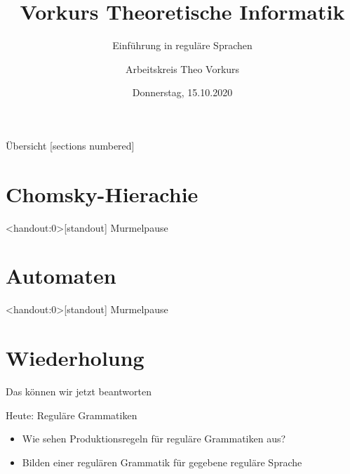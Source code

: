 

\title{Vorkurs Theoretische Informatik}
\subtitle{Einführung in reguläre Sprachen}
\date{Donnerstag, 15.10.2020}
\author{Arbeitskreis  Theo Vorkurs}



\maketitle

\begin{frame}[fragile]{Übersicht}
  [sections numbered]
  \tableofcontents%
\end{frame}


\section{Chomsky-Hierachie}



\begin{frame}<handout:0>[standout]
  Murmelpause
\end{frame}

\section{Automaten}



\begin{frame}<handout:0>[standout]
  Murmelpause
\end{frame}





\section{Wiederholung}


\begin{frame}[fragile]{Das können wir jetzt beantworten}
  \begin{alertblock}{Heute: Reguläre Grammatiken}
    \begin{itemize}
      \item Wie sehen Produktionsregeln für reguläre Grammatiken aus?
      \item Bilden einer regulären Grammatik für gegebene reguläre Sprache
    \end{itemize}
  \end{alertblock}
\end{frame}

